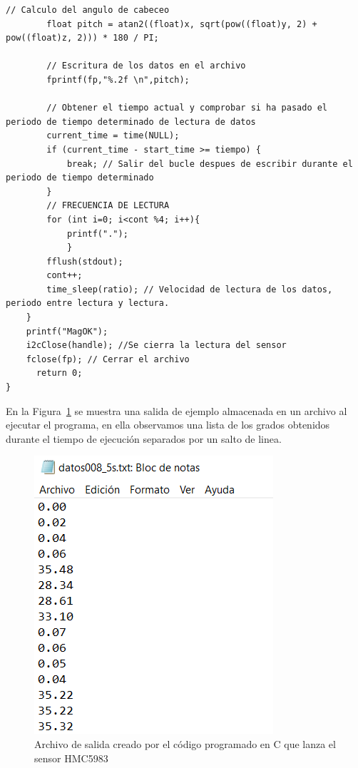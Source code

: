 \begin{lstlisting}[frame=single]
        // Calculo del angulo de cabeceo
        float pitch = atan2((float)x, sqrt(pow((float)y, 2) + pow((float)z, 2))) * 180 / PI;

        // Escritura de los datos en el archivo
        fprintf(fp,"%.2f \n",pitch);
        
        // Obtener el tiempo actual y comprobar si ha pasado el periodo de tiempo determinado de lectura de datos
        current_time = time(NULL);
        if (current_time - start_time >= tiempo) {
            break; // Salir del bucle despues de escribir durante el periodo de tiempo determinado
        }
		// FRECUENCIA DE LECTURA
        for (int i=0; i<cont %4; i++){
            printf(".");
            }
        fflush(stdout);
        cont++;
        time_sleep(ratio); // Velocidad de lectura de los datos, periodo entre lectura y lectura. 
    }
    printf("MagOK");
    i2cClose(handle); //Se cierra la lectura del sensor
    fclose(fp); // Cerrar el archivo
      return 0;
}
\end{lstlisting}

En la Figura~\ref{fig:salidaHMCC} se muestra una salida de ejemplo almacenada en un archivo al ejecutar el programa, en ella observamos una lista de los grados obtenidos durante el tiempo de ejecución separados por un salto de linea.

\begin{figure}[h]
\centering
\includegraphics[scale=0.75]{images/salidaHMC5983C.png}
\caption [Archivo de salida código C del sensor HMC5983]{Archivo de salida creado por el código programado en C que lanza el sensor HMC5983}%
\label{fig:salidaHMCC}
\end{figure}


